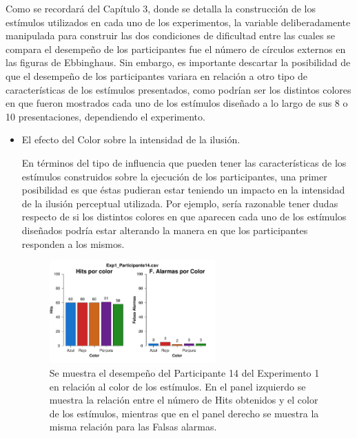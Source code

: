 Como se recordará del Capítulo 3, donde se detalla la construcción de los estímulos utilizados en cada uno de los experimentos, la variable deliberadamente manipulada para construir las dos condiciones de dificultad entre las cuales se compara el desempeño de los participantes fue el número de círculos externos en las figuras de Ebbinghaus. Sin embargo, es importante descartar la posibilidad de que el desempeño de los participantes variara en relación a otro tipo de características de los estímulos presentados, como podrían ser los distintos colores en que fueron mostrados cada uno de los estímulos diseñado a lo largo de sus 8 o 10 presentaciones, dependiendo el experimento.\\

\begin{itemize}
\item El efecto del Color sobre la intensidad de la ilusión.

En términos del tipo de influencia que pueden tener las características de los estímulos construidos sobre la ejecución de los participantes, una primer posibilidad es que éstas pudieran estar teniendo un impacto en la intensidad de la ilusión perceptual utilizada. Por ejemplo, sería razonable tener dudas respecto de si los distintos colores en que aparecen cada uno de los estímulos diseñados podría estar alterando la manera en que los participantes responden a los mismos.\\ 

\begin{figure}[th]
\centering
\includegraphics[width=0.60\textwidth]{Figures/Color_Exp1_P14}
\caption[Hits y Falsas Alarmas por Color; Ejemplo]{Se muestra el desempeño del Participante 14 del Experimento 1 en relación al color de los estímulos. En el panel izquierdo se muestra la relación entre el número de Hits obtenidos y el color de los estímulos, mientras que en el panel derecho se muestra la misma relación para las Falsas alarmas.}
\label{fig:Color_E2_P14}
\end{figure}


\end{itemize}
